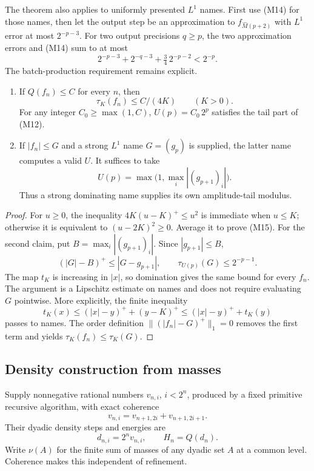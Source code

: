 The theorem also applies to uniformly presented \(L^1\) names.  First use
(M14) for those names, then let the output step be an approximation to
\(f_{\widehat M(p+2)}\) with \(L^1\) error at most \(2^{-p-3}\).
For two output precisions \(q\ge p\), the two approximation errors and
(M14) sum to at most
\[
 2^{-p-3}+2^{-q-3}+\tfrac34\,2^{-p-2}<2^{-p}.
 \]
The batch-production requirement remains explicit.

\begin{proposition}\label{m:ui}
\begin{enumerate}
\item If \(Q(f_n)\le C\) for every \(n\), then
\[
 \tau_K(f_n)\le C/(4K)\qquad(K>0).
 \tag{M15}
\]
For any integer \(C_0\ge\max(1,C)\),
\(U(p)=C_0\,2^p\) satisfies the tail part of (M12).
\item If \(|f_n|\le G\) and a strong \(L^1\) name \(G=(g_p)\) is supplied,
the latter name computes a valid \(U\).  It suffices to take
\[
 U(p)=\max\bigl(1,\max_i |(g_{p+1})_i|\bigr).
 \tag{M16}
\]
Thus a strong dominating name supplies its own amplitude-tail modulus.
\end{enumerate}
\end{proposition}

\begin{proof}
For \(u\ge0\), the inequality \(4K(u-K)^+\le u^2\) is immediate when
\(u\le K\); otherwise it is equivalent to \((u-2K)^2\ge0\).
Average it to prove (M15).
For the second claim, put \(B=\max_i|(g_{p+1})_i|\).  Since \(|g_{p+1}|\le B\),
\[
 (|G|-B)^+\le |G-g_{p+1}|,
 \qquad
 \tau_{U(p)}(G)\le2^{-p-1}.
 \]
The map \(t_K\) is increasing in \(|x|\), so domination gives the same bound
for every \(f_n\).  The argument is a Lipschitz estimate on names and does
not require evaluating \(G\) pointwise.
More explicitly, the finite inequality
\[
 t_K(x)\le(|x|-y)^+ +(y-K)^+
          \le(|x|-y)^+ +t_K(y)
 \]
passes to names.  The order definition
\(\|(|f_n|-G)^+\|_1=0\) removes the first term and yields
\(\tau_K(f_n)\le\tau_K(G)\).
\end{proof}

\subsection{Density construction from masses}

\begin{definition}\label{m:masses}
Supply nonnegative rational numbers \(v_{n,i}\), \(i<2^n\), produced by a
fixed primitive recursive algorithm, with exact coherence
\[
 v_{n,i}=v_{n+1,2i}+v_{n+1,2i+1}.
 \tag{M17}
\]
Their dyadic density steps and energies are
\[
 d_{n,i}=2^n v_{n,i},\qquad H_n=Q(d_n).
 \]
Write \(\nu(A)\) for the finite sum of masses of any dyadic set \(A\) at a
common level.  Coherence makes this independent of refinement.
\end{definition}

